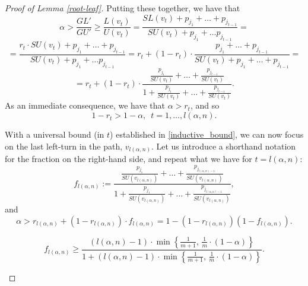 \documentclass[a4paper,UKenglish,cleveref, autoref, thm-restate, pdfa]{lipics-v2021}
\theoremstyle{plain}
\begin{document}
\begin{proof}[Proof of Lemma \ref{root-leaf}]
    Putting these together, we have that
    \[
    \alpha > \frac{GL'}{GU'} \ge \frac{L(v_t)}{U(v_t)} = \frac{SL(v_t) + p_{j_1} + \ldots + p_{j_{t-1}}}{SU(v_t) + p_{j_{1}} + \ldots p_{j_{t-1}}} = 
    \]
    \[
    =\frac{r_t \cdot SU(v_t) + p_{j_1} + \ldots + p_{j_{t-1}}}{SU(v_t) + p_{j_1} + \ldots p_{j_{t-1}}} = r_t + (1-r_t)\cdot \frac{p_{j_1} + \ldots + p_{j_{t-1}}}{SU(v_t) + p_{j_1} + \ldots + p_{j_{t-1}}} =
    \]
    \[
    =  r_t + (1-r_t)\cdot \frac{\frac{p_{j_1}}{SU(v_t)} + \ldots + \frac{p_{j_{t-1}}}{SU(v_t)}}{1 + \frac{p_{j_1}}{SU(v_t)} + \ldots + \frac{p_{j_{t-1}}}{SU(v_t)}}.
    \]
    As an immediate consequence, we have that $\alpha > r_t$, and so
    \begin{equation}\label{inductive_bound}
        1-r_t > 1- \alpha, \,\,\, t = 1, \ldots, l(\alpha, n).
    \end{equation}

    With a universal bound (in $t$) established in \eqref{inductive_bound}, we can now focus on the last left-turn in the path, $v_{l(\alpha, n)}$. Let us introduce a shorthand notation for the fraction on the right-hand side, and repeat what we have for $t=l(\alpha, n)$:
    \[
    f_{l(\alpha, n)} := \frac{\frac{p_{j_1}}{SU(v_{l(\alpha, n)})} + \ldots + \frac{p_{j_{l(\alpha, n)-1}}}{SU(v_{l(\alpha, n)})}}
    {1 + \frac{p_{j_1}}{SU(v_{l(\alpha, n)})} + \ldots + \frac{p_{j_{l(\alpha, n)-1}}}{SU(v_{l(\alpha, n)})}},
    \]
    and
    \begin{equation}\label{alpha}
        \alpha > r_{l(\alpha, n)} + (1-r_{l(\alpha, n)}) \cdot f_{l(\alpha, n)} = 1 - (1-r_{l(\alpha, n)})(1-f_{l(\alpha,n)}).
    \end{equation}

    \begin{lmm}\label{f}
        \[
        f_{l(\alpha, n)} \ge \frac{(l(\alpha, n) -1)\cdot \min\left\{\frac{1}{m+1},\, \frac{1}{m} \cdot (1-\alpha)\right\}}{1+(l(\alpha, n) -1)\cdot \min\left\{\frac{1}{m+1},\, \frac{1}{m} \cdot (1-\alpha)\right\}}.
        \]
    \end{lmm}


\end{proof}
\end{document}

